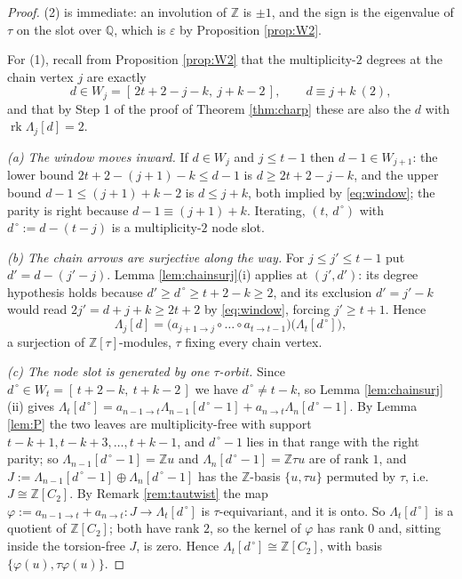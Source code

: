 \documentclass[reqno]{amsart}
\theoremstyle{plain}
\theoremstyle{definition}
\newcommand{\eps}{\varepsilon}
\begin{document}
\begin{proof}
(2) is immediate: an involution of $\mathbb{Z}$ is $\pm1$, and the sign is the
eigenvalue of $\tau$ on the slot over $\mathbb{Q}$, which is $\eps$ by
Proposition \ref{prop:W2}.

For (1), recall from Proposition \ref{prop:W2} that the multiplicity-$2$
degrees at the chain vertex $j$ are exactly
\begin{equation}\label{eq:window}
   d\in W_j=[\,2t+2-j-k,\ j+k-2\,],\qquad d\equiv j+k\ (2),
\end{equation}
and that by Step 1 of the proof of Theorem \ref{thm:charp} these are also the
$d$ with $\operatorname{rk}\Lambda_j[d]=2$.

\emph{(a) The window moves inward.}  If $d\in W_j$ and $j\le t-1$ then
$d-1\in W_{j+1}$: the lower bound $2t+2-(j+1)-k\le d-1$ is
$d\ge2t+2-j-k$, and the upper bound $d-1\le (j+1)+k-2$ is $d\le j+k$, both
implied by \eqref{eq:window}; the parity is right because $d-1\equiv
(j+1)+k$.  Iterating, $(t,\,d^{\,\circ})$ with $d^{\,\circ}:=d-(t-j)$ is a
multiplicity-$2$ node slot.

\emph{(b) The chain arrows are surjective along the way.}  For
$j\le j'\le t-1$ put $d'=d-(j'-j)$.  Lemma \ref{lem:chainsurj}(i) applies at
$(j',d')$: its degree hypothesis holds because
$d'\ge d^{\,\circ}\ge t+2-k\ge2$, and its exclusion $d'=j'-k$ would read
$2j'=d+j+k\ge2t+2$ by \eqref{eq:window}, forcing $j'\ge t+1$.  Hence
\[
   \Lambda_j[d]=\bigl(a_{j+1\to j}\circ\dots\circ a_{t\to t-1}\bigr)
                \bigl(\Lambda_t[d^{\,\circ}]\bigr),
\]
a surjection of $\mathbb{Z}[\tau]$-modules, $\tau$ fixing every chain vertex.

\emph{(c) The node slot is generated by one $\tau$-orbit.}  Since
$d^{\,\circ}\in W_t=[\,t+2-k,\ t+k-2\,]$ we have $d^{\,\circ}\ne t-k$, so
Lemma \ref{lem:chainsurj}(ii) gives
$\Lambda_t[d^{\,\circ}]=a_{n-1\to t}\Lambda_{n-1}[d^{\,\circ}-1]
+a_{n\to t}\Lambda_{n}[d^{\,\circ}-1]$.  By Lemma \ref{lem:P} the two leaves
are multiplicity-free with support $t-k+1,t-k+3,\dots,t+k-1$, and
$d^{\,\circ}-1$ lies in that range with the right parity; so
$\Lambda_{n-1}[d^{\,\circ}-1]=\mathbb{Z}u$ and
$\Lambda_{n}[d^{\,\circ}-1]=\mathbb{Z}\tau u$ are of rank $1$, and
$J:=\Lambda_{n-1}[d^{\,\circ}-1]\oplus\Lambda_{n}[d^{\,\circ}-1]$ has the
$\mathbb{Z}$-basis $\{u,\tau u\}$ permuted by $\tau$, i.e.\
$J\cong\mathbb{Z}[C_2]$.  By Remark \ref{rem:tautwist} the map
$\varphi:=a_{n-1\to t}+a_{n\to t}:J\to\Lambda_t[d^{\,\circ}]$ is
$\tau$-equivariant, and it is onto.  So
$\Lambda_t[d^{\,\circ}]$ is a quotient of $\mathbb{Z}[C_2]$; both have rank
$2$, so the kernel of $\varphi$ has rank $0$ and, sitting inside the
torsion-free $J$, is zero.  Hence $\Lambda_t[d^{\,\circ}]\cong\mathbb{Z}[C_2]$,
with basis $\{\varphi(u),\tau\varphi(u)\}$.


\end{proof}
\end{document}
